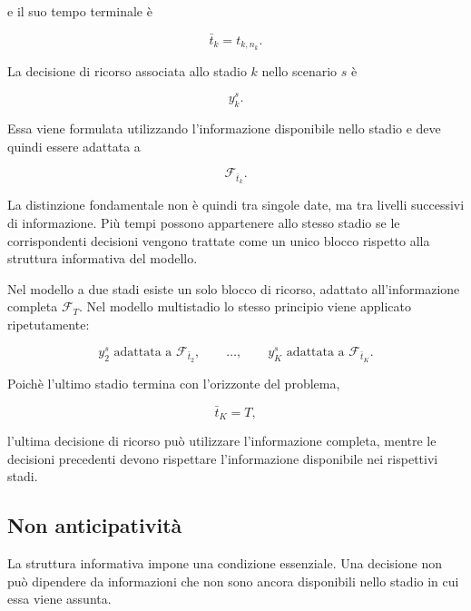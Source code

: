 e il suo tempo terminale \`e

\[
\bar t_k
=
t_{k,n_k}.
\]

La decisione di ricorso associata allo stadio $k$ nello scenario $s$ \`e

\[
y_k^s.
\]

Essa viene formulata utilizzando l'informazione disponibile nello stadio e
deve quindi essere adattata a

\[
\mathcal F_{\bar t_k}.
\]

La distinzione fondamentale non \`e quindi tra singole date, ma tra livelli
successivi di informazione. Pi\`u tempi possono appartenere allo stesso
stadio se le corrispondenti decisioni vengono trattate come un unico blocco
rispetto alla struttura informativa del modello.

Nel modello a due stadi esiste un solo blocco di ricorso, adattato
all'informazione completa $\mathcal F_T$. Nel modello multistadio lo stesso
principio viene applicato ripetutamente:

\[
y_2^s
\text{ adattata a }
\mathcal F_{\bar t_2},
\qquad
\ldots,
\qquad
y_K^s
\text{ adattata a }
\mathcal F_{\bar t_K}.
\]

Poich\`e l'ultimo stadio termina con l'orizzonte del problema,

\[
\bar t_K=T,
\]

l'ultima decisione di ricorso pu\`o utilizzare l'informazione completa,
mentre le decisioni precedenti devono rispettare l'informazione disponibile
nei rispettivi stadi.

\subsection{Non anticipativit\`a}

La struttura informativa impone una condizione essenziale. Una decisione non
pu\`o dipendere da informazioni che non sono ancora disponibili nello stadio
in cui essa viene assunta.

